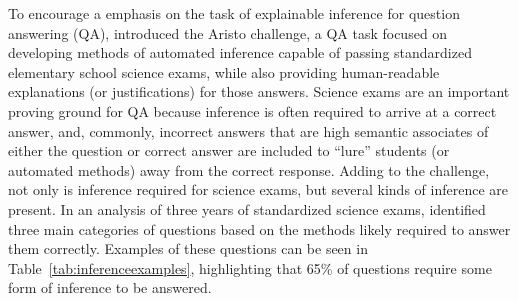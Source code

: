 To encourage a emphasis on the task of explainable inference for question answering (QA), \citet{clark:2015} introduced the Aristo challenge, a QA task focused on developing methods of automated inference capable of passing standardized elementary school science exams, while also providing human-readable explanations (or justifications) for those answers.  Science exams are an important proving ground for QA because inference is often required to arrive at a correct answer, and, commonly, incorrect answers that are high semantic associates of either the question or correct answer are included to ``lure'' students (or automated methods) away from the correct response.
%
%
%
Adding to the challenge, not only is inference required for science exams, but several kinds of inference are present.
In an analysis of three years of standardized science exams, \citet{clark:2013} identified three main categories of questions based on the methods likely required to answer them correctly. Examples of these questions can be seen in Table~\ref{tab:inferenceexamples}, highlighting that 65\% of questions require some form of inference to be answered.

